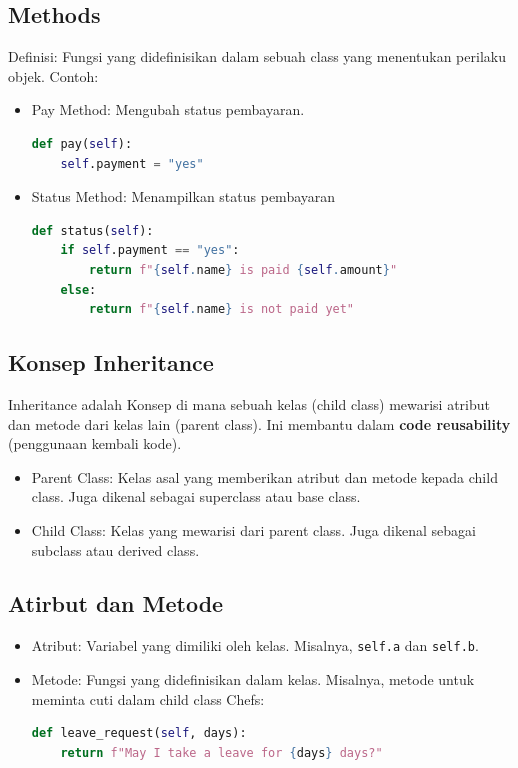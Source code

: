 \documentclass{article}
\begin{document}
\subsection{Methods}
Definisi: Fungsi yang didefinisikan dalam sebuah class yang menentukan perilaku objek.
Contoh:
\begin{itemize}
    \item Pay Method: Mengubah status pembayaran.
          \begin{lstlisting}[language=Python, caption={}, captionpos=b]
def pay(self):
    self.payment = "yes"
\end{lstlisting}
    \item Status Method: Menampilkan status pembayaran
          \begin{lstlisting}[language=Python, caption={}, captionpos=b]
def status(self):
    if self.payment == "yes":
        return f"{self.name} is paid {self.amount}"
    else:
        return f"{self.name} is not paid yet"
\end{lstlisting}
\end{itemize}

\subsection{Konsep Inheritance}
Inheritance adalah  Konsep di mana sebuah kelas (child class) mewarisi atribut dan metode dari kelas lain (parent class). Ini membantu dalam \textbf{code reusability} (penggunaan kembali kode).
\begin{itemize}
    \item Parent Class: Kelas asal yang memberikan atribut dan metode kepada child class. Juga dikenal sebagai superclass atau base class.
    \item Child Class: Kelas yang mewarisi dari parent class. Juga dikenal sebagai subclass atau derived class.
\end{itemize}

\subsection{Atirbut dan Metode}
\begin{itemize}
    \item Atribut: Variabel yang dimiliki oleh kelas. Misalnya, \verb|self.a| dan \verb|self.b|.
    \item Metode: Fungsi yang didefinisikan dalam kelas. Misalnya, metode untuk meminta cuti dalam child class Chefs:
          \begin{lstlisting}[language=Python, caption={}, captionpos=b]
def leave_request(self, days):
    return f"May I take a leave for {days} days?"
\end{lstlisting}
\end{itemize}
\end{document}
